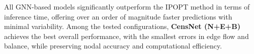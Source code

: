 All GNN-based models significantly outperform the IPOPT method in terms of inference time, offering over an order of magnitude faster predictions with minimal variability. Among the tested configurations, \textbf{CensNet (N+E+B)} achieves the best overall performance, with the smallest errors in edge flow and balance, while preserving nodal accuracy and computational efficiency.

%  
%
%

